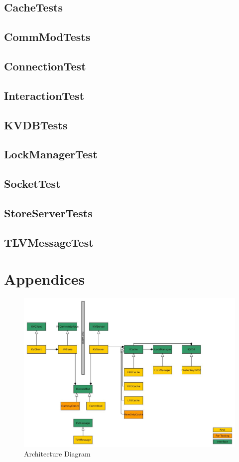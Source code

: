 \documentclass[12pt]{article}
\begin{document}
\begin{multicols}{2}
\subsection{CacheTests}

\subsection{CommModTests}

\subsection{ConnectionTest}

\subsection{InteractionTest}

\subsection{KVDBTests}

\subsection{LockManagerTest}

\subsection{SocketTest}

\subsection{StoreServerTests}

\subsection{TLVMessageTest}

\end{multicols}

\newpage

\section{Appendices}

\begin{figure}[H]
\centering
\includegraphics[scale=0.50]{architecture}
\caption{Architecture Diagram}
\label{arch}
\end{figure}
\end{document}
